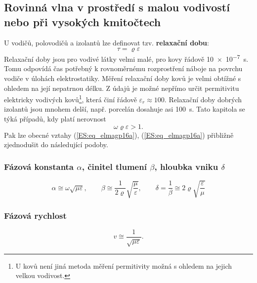     \subsection{Rovinná vlna v prostředí s malou vodivostí nebo při vysokých kmitočtech}
      U vodičů, polovodičů a izolantů lze definovat tzv. \textbf{relaxační dobu}:
      \begin{equation}\label{ES:eq_elmagp42}
        \tau = \varrho\varepsilon
      \end{equation}
      Relaxační doby jsou pro vodivé látky velmi malé, pro kovy řádově \SI{10e-7}{\s}. Tomu 
      odpovídá čas potřebný k rovnoměrnému rozprostření náboje na povrchu vodiče v úlohách 
      elektrostatiky. Měření relaxační doby kovů je velmi obtížné s ohledem na její nepatrnou 
      délku. Z údajů je možné nepřímo určit permitivitu elektricky vodivých kovů\footnote{U 
      kovů není jiná metoda měření permitivity možná s ohledem na jejich velkou vodivost.}, která 
      činí řádově \(\varepsilon_r \approx 100\). Relaxační doby dobrých izolantů jsou mnohem delší, 
      např. porcelán dosahuje asi \SI{100}{\s}. Tato kapitola se týká případů, kdy platí nerovnost
      \begin{equation}\label{ES:eq_elmagp43}
        \omega\varrho\varepsilon > 1.
      \end{equation}
      Pak lze obecné vztahy (\ref{ES:eq_elmagp16a}), (\ref{ES:eq_elmagp16a}) přibližně zjednodušit 
      do následující podoby.

    \subsubsection{Fázová konstanta \(\alpha\), činitel tlumení \(\beta\), hloubka vniku 
                     \(\delta\)}
       \begin{equation}\label{ES:eq_elmagp44}
         \alpha \cong \omega\sqrt{\mu\varepsilon}, \qquad
         \beta  \cong \frac{1}{2\varrho}\sqrt{\frac{\mu}{\varepsilon}}, \qquad
         \delta = \frac{1}{\beta}\cong2\varrho\sqrt{\frac{\varepsilon}{\mu}}
       \end{equation}

    \subsubsection{Fázová rychlost}
    \begin{equation}\label{ES:eq_elmagp45}
      v \cong \frac{1}{\sqrt{\mu\varepsilon}}.
    \end{equation}
    
